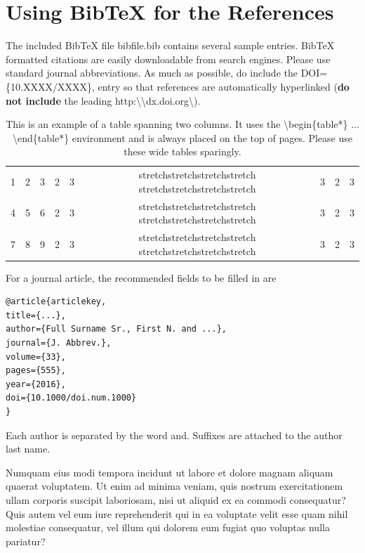 \documentclass[10pt,a4paper,twocolumn]{article}
\begin{document}
\section{Using BibTeX for the References}
The included BibTeX file {\ttfamily bibfile}.{\ttfamily bib} contains several sample entries. BibTeX formatted citations are easily downloadable from search engines. Please use standard journal abbreviations. As much as possible, do include the {\ttfamily DOI}=\{{\ttfamily 10.XXXX}/{\ttfamily XXXX}\}{\ttfamily ,} entry so that references are automatically hyperlinked (\textbf{do not include} the leading {\ttfamily http}:\textbackslash\textbackslash{\ttfamily dx.doi.org}\textbackslash).
\begin{table}
  \centering
	\caption{This is an example of a table spanning two columns. It uses the \textbackslash{\ttfamily begin}\{{\ttfamily table*}\} ... \textbackslash {\ttfamily end}\{{\ttfamily table*}\} environment and is always placed on the top of pages. Please use these wide tables sparingly.} \label{table:wide}
  \begin{tabular}{lcccccccc}
	  \toprule
    1 & 2 & 3 & 2 & 3 & stretchstretchstretchstretch  stretchstretchstretchstretch & 3 & 2 & 3 \\       
		4 & 5 & 6 & 2 & 3 & stretchstretchstretchstretch  stretchstretchstretchstretch & 3 & 2 & 3 \\        
		7 & 8 & 9 & 2 & 3 & stretchstretchstretchstretch  stretchstretchstretchstretch & 3 & 2 & 3 \\
		\bottomrule
  \end{tabular}
\end{table}

For a journal article, the recommended fields to be filled in are
\begin{verbatim}
@article{articlekey,
title={...},
author={Full Surname Sr., First N. and ...},
journal={J. Abbrev.},
volume={33},
pages={555},
year={2016},
doi={10.1000/doi.num.1000}
}
\end{verbatim}
Each author is separated by the word {\ttfamily and}. Suffixes are attached to the author last name.

Numquam eius modi tempora incidunt ut labore et dolore magnam aliquam quaerat voluptatem. Ut enim ad minima veniam, quis nostrum exercitationem ullam corporis suscipit laboriosam, nisi ut aliquid ex ea commodi consequatur? Quis autem vel eum iure reprehenderit qui in ea voluptate velit esse quam nihil molestiae consequatur, vel illum qui dolorem eum fugiat quo voluptas nulla pariatur?
\end{document}
